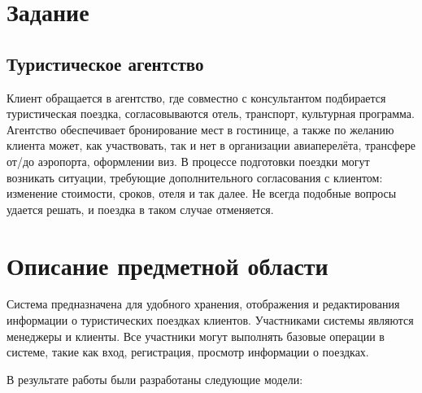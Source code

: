 \documentclass[a4paper,12pt]{article}
\begin{document}


\section{Задание}

\subsection{Туристическое агентство}

Клиент обращается в агентство,
где совместно с консультантом подбирается туристическая поездка, согласовываются отель, транспорт, культурная программа.
Агентство обеспечивает бронирование мест в гостинице, а также по желанию клиента может,
как участвовать, так и нет в организации авиаперелёта, трансфере от/до аэропорта, оформлении виз.
В процессе подготовки поездки могут возникать ситуации, требующие дополнительного согласования с клиентом:
изменение стоимости, сроков, отеля и так далее. Не всегда подобные вопросы удается решать, и поездка в таком случае отменяется.

\section{Описание предметной области}

Система предназначена для удобного хранения,
отображения и редактирования информации о туристических поездках клиентов. Участниками системы являются менеджеры и клиенты.
Все участники могут выполнять базовые операции в системе, такие как вход, регистрация, просмотр информации о поездках.

В результате работы были разработаны следующие модели:
\end{document}
